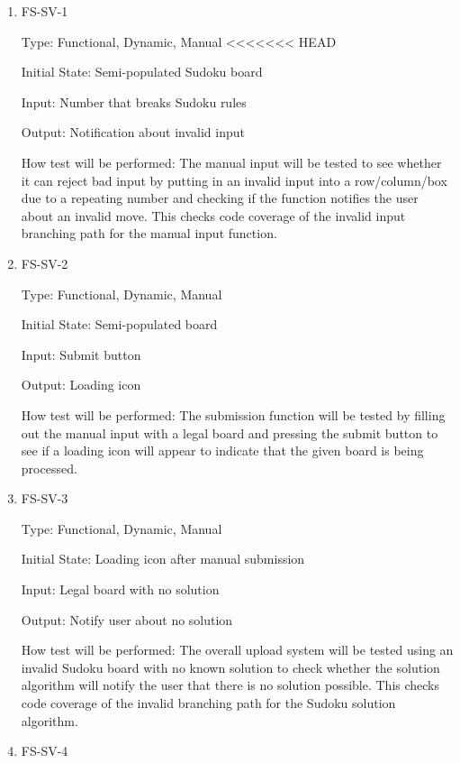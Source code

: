 \documentclass[11pt]{article}
\begin{document}
\begin{enumerate}

\item{FS-SV-1\\}

Type: Functional, Dynamic, Manual
<<<<<<< HEAD
					
Initial State: Semi-populated Sudoku board
					
Input: Number that breaks Sudoku rules
					
Output: Notification about invalid input
					
How test will be performed: The manual input will be tested to see whether it can reject bad input by putting in an invalid input into a row/column/box due to a repeating number and checking if the function notifies the user about an invalid move. This checks code coverage of the invalid input branching path for the manual input function.
					
\item{FS-SV-2\\}

Type: Functional, Dynamic, Manual
					
Initial State: Semi-populated board
					
Input: Submit button
					
Output: Loading icon
					
How test will be performed: The submission function will be tested by filling out the manual input with a legal board and pressing the submit button to see if a loading icon will appear to indicate that the given board is being processed.

\item{FS-SV-3\\}

Type: Functional, Dynamic, Manual
					
Initial State: Loading icon after manual submission
					
Input: Legal board with no solution
					
Output: Notify user about no solution
					
How test will be performed: The overall upload system will be tested using an invalid Sudoku board with no known solution to check whether the solution algorithm will notify the user that there is no solution possible. This checks code coverage of the invalid branching path for the Sudoku solution algorithm.

\item{FS-SV-4\\}


\end{enumerate}
\end{document}
